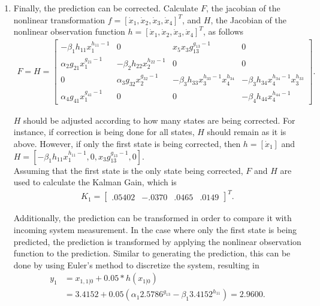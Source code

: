 \begin{enumerate}
\item Finally, the prediction can be corrected. Calculate $F$, the jacobian of the nonlinear transformation $f=[\dot x_1, \dot x_2, \dot x_3, \dot x_4]^T$, and $H$, the Jacobian of the nonlinear observation function $h=[\dot x_1, \dot x_2, \dot x_3, \dot x_4]^T$, as follows
\begin{align*}
F = H = 
\begin{bmatrix}
-\beta_1 h_{11} x_1^{h_{11}-1} & 0 & x_5 x_3 g_{13} ^{g_{13}-1}& 0 \\
\alpha_2  g_{21} x_1^{g_{21}-1} & -\beta_2 h_{22} x_2^{h_{22}-1}&0&0\\
0&\alpha_3 g_{32} x_2^{g_{32}-1} & -\beta_3 h_{33} x_3^{h_{33}-1} x_4^{h_{34}}&-\beta_3 h_{34} x_4^{h_{34}-1} x_3^{h_{33}}\\
\alpha_4 g_{41} x_1^{g_{41}-1}&0&0&-\beta_4 h_{44} x_4^{h_{44}-1}
\end{bmatrix}.
\end{align*}




\noindent  $H$ should be adjusted according to how many states are being corrected. For instance, if correction is being done for all states, $H$ should remain as it is above. However, if only the first state is being corrected, then $h = [\dot x_1]$ and $H = [-\beta_1 h_{11} x_1^{h_{11}-1},  0,  x_3 g_{13} ^{g_{13}-1}, 0 ]$. \\

\noindent Assuming that the first state is the only state being corrected, $F$ and $H$ are used to calculate the Kalman Gain, which is 
\begin{align*}
K_1 = 
\begin{bmatrix}
.05402 & -.0370 & .0465 & .0149
\end{bmatrix}^T.
\end{align*}

\noindent Additionally, the prediction can be transformed in order to compare it with incoming system measurement. In the case where only the first state is being predicted, the prediction is transformed by applying the nonlinear observation function to the prediction. Similar to generating the prediction, this can be done by using Euler's method to discretize the system, resulting in
\begin{align*}
y_{1} &=  x_{1,1|0} + 0.05 * h(x_{1|0}) \\ 
&=3.4152  + 0.05(\alpha_1 2.5786 ^{g_{13}} - \beta_1 3.4152  ^{h_{11}} )=
2.9600.
\end{align*}


\end{enumerate}
